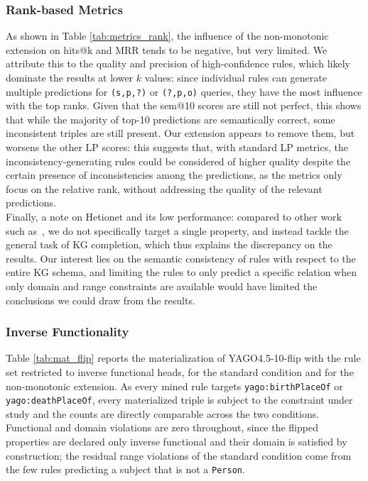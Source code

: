 \documentclass[a4paper,UKenglish,cleveref, autoref, thm-restate]{tgdk-v2021}
\begin{document}
\subsubsection{Rank-based Metrics} As shown in Table \ref{tab:metrics_rank}, the influence of the non-monotonic extension on hits@k and MRR tends to be negative, but very limited. We attribute this to the quality and precision of high-confidence rules, which likely dominate the results at lower $k$ values: since individual rules can generate multiple predictions for \texttt{(s,p,?)} or \texttt{(?,p,o)} queries, they have the most influence with the top ranks. Given that the sem@10 scores are still not perfect, this shows that while the majority of top-10 predictions are semantically correct, some inconsistent triples are still present. Our extension appears to remove them, but worsens the other LP scores: this suggests that, with standard LP metrics, the inconsistency-generating rules could be considered of higher quality despite the certain presence of inconsistencies among the predictions, as the metrics only focus on the relative rank, without addressing the quality of the relevant predictions.\\
\indent Finally, a note on Hetionet and its low performance: compared to other work such as~\cite{betz_supervised_2022}, we do not specifically target a single property, and instead tackle the general task of KG completion, which thus explains the discrepancy on the results. Our interest lies on the semantic consistency of rules with respect to the entire KG schema, and limiting the rules to only predict a specific relation when only domain and range constraints are available would have limited the conclusions we could draw from the results.
\subsubsection{Inverse Functionality} 
Table \ref{tab:mat_flip} reports the materialization of YAGO4.5-10-flip with the rule set restricted to inverse functional heads, for the standard condition and for the non-monotonic extension. As every mined rule targets \texttt{yago:birthPlaceOf} or \texttt{yago:deathPlaceOf}, every materialized triple is subject to the constraint under study and the counts are directly comparable across the two conditions. Functional and domain violations are zero throughout, since the flipped properties are declared only inverse functional and their domain is satisfied by construction; the residual range violations of the standard condition come from the few rules predicting a subject that is not a \texttt{Person}.
\end{document}
